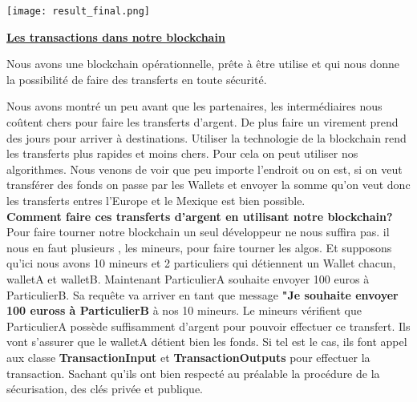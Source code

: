 \documentclass[12pt]{report}
\begin{document}
\texttt{[image: result\_final.png]}
\begin{center}
   \textbf{\underline{Les transactions dans notre blockchain }} \\[1cm]
\end{center}

\hspace{1cm} Nous avons une blockchain opérationnelle, prête à être utilise et qui nous donne la possibilité de faire des transferts en toute sécurité.

\hspace{1cm} Nous avons montré un peu avant que les partenaires, les intermédiaires nous coûtent chers pour faire les transferts d'argent. De plus faire un virement prend des jours pour arriver à destinations. Utiliser la technologie de la blockchain rend les transferts plus rapides et moins chers. Pour cela on peut utiliser nos algorithmes. Nous venons de voir que peu importe l'endroit ou on est, si on veut transférer des fonds on passe par les Wallets et envoyer la somme qu'on veut donc les transferts entres l’Europe et le Mexique est bien possible.\\

\hspace{1cm} \textbf{Comment faire ces transferts d'argent en utilisant notre blockchain?}\\
Pour faire tourner notre blockchain un seul développeur ne nous suffira pas. il nous en faut plusieurs , les mineurs, pour faire tourner les algos. Et supposons qu'ici nous avons 10 mineurs et 2 particuliers qui détiennent un Wallet chacun, walletA et walletB. Maintenant ParticulierA souhaite envoyer 100 euros à ParticulierB. Sa requête va arriver en tant que message \textbf{"Je souhaite envoyer 100 euross à ParticulierB} à nos 10 mineurs. Le mineurs vérifient que ParticulierA possède suffisamment d’argent pour pouvoir effectuer ce transfert. Ils vont s'assurer que le  walletA détient bien les fonds. Si tel est  le cas, ils font appel aux classe \textbf{TransactionInput} et \textbf{TransactionOutputs} pour effectuer la transaction. Sachant qu'ils ont bien respecté au préalable la procédure de la sécurisation, des clés privée et publique.\\
\end{document}
